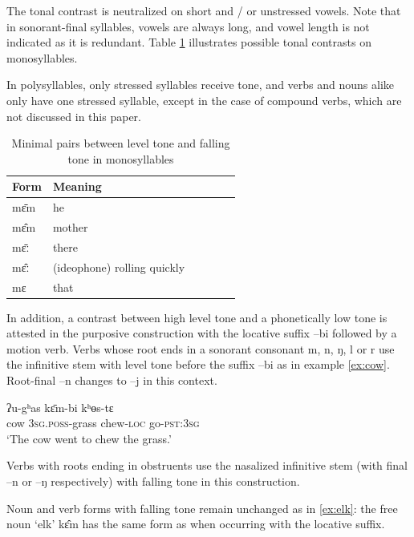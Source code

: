 \documentclass[oldfontcommands,oneside,a4paper,11pt]{article}
\newcommand{\ipa}[1]{{\phon \mbox{#1}}} %
\begin{document}
 The tonal contrast is neutralized  on short  and / or unstressed vowels. Note that in sonorant-final syllables, vowels are always long, and vowel length is not indicated as it is redundant. Table \ref{tab:minimal.pairs} illustrates possible tonal contrasts on monosyllables.  

In polysyllables, only stressed syllables receive tone, and verbs and nouns alike only have one stressed syllable, except in the case of compound verbs, which are not discussed in this paper.

\begin{table}[h]
\caption{Minimal pairs between level tone and falling tone in monosyllables } \label{tab:minimal.pairs}\centering
\begin{tabular}{llllll}
\toprule
Form & Meaning\\
\midrule
\ipa{mɛ̄m} & he \\
\ipa{mɛ̂m} & mother\\
\midrule
\ipa{mɛ̄ː} & there\\
\ipa{mɛ̂ː} & (ideophone) rolling quickly \\
\ipa{mɛ} & that\\
\bottomrule
\end{tabular}
\end{table}

In addition, a contrast between high level tone and a phonetically low tone is attested in the purposive construction with the locative suffix \ipa{--bi} followed by a motion verb. Verbs  whose root ends in a sonorant consonant \ipa{m}, \ipa{n}, \ipa{ŋ}, \ipa{l} or \ipa{r} use the infinitive stem with level tone before the suffix \ipa{--bi} as in example \ref{ex:cow}. Root-final   \ipa{--n} changes to \ipa{--j} in this context. 

\begin{exe}
\ex \label{ex:cow}
\gll \ipa{bʌ̂j} \ipa{ʔu-gʰas} \ipa{kɛ̄m-bi} \ipa{kʰɵs-tɛ}  \\
cow \textsc{3sg.poss}-grass chew-\textsc{loc} go-\textsc{pst:3sg} \\
\glt `The cow went to chew the grass.'
\end{exe}

Verbs with roots ending in obstruents use the nasalized infinitive stem (with final \ipa{--n} or \ipa{--ŋ} respectively) with falling tone in this construction.

Noun  and verb forms with falling tone  remain unchanged as in \ref{ex:elk}: the free noun `elk' \ipa{kɛ̂m} has the same form as when occurring with the locative suffix.
\end{document}
